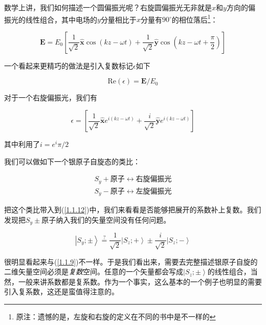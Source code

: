 \documentclass[UTF8,twoside]{ctexart}
\begin{document}
数学上讲，我们如何描述一个圆偏振光呢？右旋圆偏振光无非就是$x$和$y$方向的偏振光的线性组合，其中电场的$y$分量相比于$x$分量有$90^{\circ}$的相位落后\footnote{原注：遗憾的是，左旋和右旋的定义在不同的书中是不一样的}：

\begin{equation}
\bm E = E_0 \left[\frac{1}{\sqrt{2}} \hat{\bm x}\cos\left(kz - \omega t\right) + \frac{1}{\sqrt{2}} \hat{\bm y}\cos\left(kz - \omega t + \frac{\pi}{2}\right)  \right]
\end{equation}

\noindent 一个看起来更精巧的做法是引入复数标记$\epsilon$如下

\begin{equation}
\text{Re}(\epsilon) = \bm{E} / E_0
\end{equation}

\noindent 对于一个右旋偏振光，我们有

\begin{equation}  \label{1.1.12}
\epsilon = \left[\frac{1}{\sqrt{2}} \hat{\bm x}e^{i(kz - \omega t)} + \frac{i}{\sqrt{2}} \hat{\bm y}e^{i(kz - \omega t)}  \right]
\end{equation}

\noindent 其中利用了$i = e^i\pi / 2$

我们可以做如下一个银原子自旋态的类比：

\begin{equation}
\begin{split}
S_y + \text{原子} \leftrightarrow \text{右旋偏振光}\\
S_y - \text{原子} \leftrightarrow \text{左旋偏振光}
\end{split}
\end{equation}

\noindent 把这个类比带入到(\ref{1.1.12})中，我们来看看是否能够把展开的系数补上复数。我们发现把$S_y \pm$原子纳入我们的矢量空间没有任何问题。

\begin{equation}
\left|S_y ;\pm \right\rangle \overset{?}= \frac{1}{\sqrt{2}}\left|S_z ;+\right\rangle \pm \frac{i}{\sqrt{2}}\left|S_z ;-\right\rangle
\end{equation}

\noindent 很明显看起来与(\ref{1.1.9})不一样。于是我们看出来，需要去完整描述银原子自旋的二维矢量空间必须是\emph{复数}空间。任意的一个矢量都会写成$\left|S_z; \pm\right\rangle$的线性组合，当然，一般来讲系数都是复系数。作为一个事实，这么基本的一个例子也明显的需要引入复系数，这还是蛮值得注意的。
\end{document}
